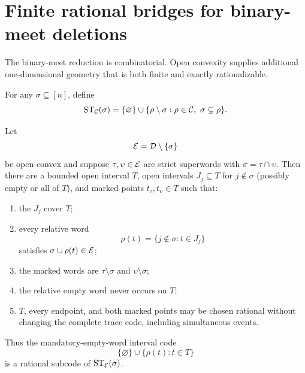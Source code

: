 \section{Finite rational bridges for binary-meet deletions}
\label{sec:rational-bridges}

The binary-meet reduction is combinatorial.  Open convexity supplies additional one-dimensional geometry that is both finite and exactly rationalizable.

\begin{definition}
For any $\sigma\subseteq[n]$, define
\[
 \operatorname{ST}_\mathcal C(\sigma)
 =\{\varnothing\}\cup
 \{\rho\setminus\sigma:\rho\in\mathcal C,\ \sigma\subsetneq\rho\}.
\]
\end{definition}

\begin{theorem}
\label{thm:rational-bridge}
Let
\[
 \mathcal E=\mathcal D\setminus\{\sigma\}
\]
be open convex and suppose $\tau,\upsilon\in\mathcal E$ are strict superwords with $\sigma=\tau\cap\upsilon$.  Then there are a bounded open interval $T$, open intervals $J_j\subseteq T$ for $j\notin\sigma$ (possibly empty or all of $T$), and marked points $t_\tau,t_\upsilon\in T$ such that:
\begin{enumerate}[label=\textup{(\roman*)}]
\item the $J_j$ cover $T$;
\item every relative word
\[
 \rho(t)=\{j\notin\sigma:t\in J_j\}
\]
satisfies $\sigma\cup\rho(t)\in\mathcal E$;
\item the marked words are $\tau\setminus\sigma$ and $\upsilon\setminus\sigma$;
\item the relative empty word never occurs on $T$;
\item $T$, every endpoint, and both marked points may be chosen rational without changing the complete trace code, including simultaneous events.
\end{enumerate}
Thus the mandatory-empty-word interval code
\[
 \{\varnothing\}\cup\{\rho(t):t\in T\}
\]
is a rational subcode of $\operatorname{ST}_\mathcal E(\sigma)$.
\end{theorem}

